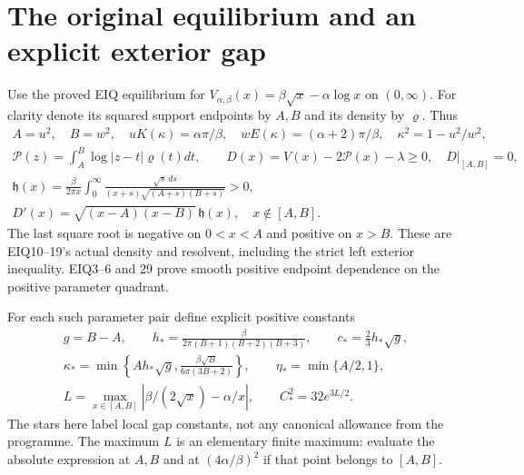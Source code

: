 \documentclass[11pt,a4paper]{article}
\begin{document}
\section{The original equilibrium and an explicit exterior gap}
Use the proved EIQ equilibrium for
$V_{\alpha,\beta}(x)=\beta\sqrt x-\alpha\log x$ on $(0,\infty)$.
For clarity denote its squared support endpoints by $A,B$ and its density by $\varrho$.
Thus
\begin{equation}
\begin{gathered}
 A=u^2,\quad B=w^2,\quad
 uK(\kappa)=\alpha\pi/\beta,\quad
 wE(\kappa)=(\alpha+2)\pi/\beta,\quad\kappa^2=1-u^2/w^2,\\
 \mathcal P(z)=\int_A^B\log|z-t|\varrho(t)dt,\qquad
 D(x)=V(x)-2\mathcal P(x)-\lambda\ge0,\quad D|_{[A,B]}=0,\\
 \mathfrak h(x)=\frac{\beta}{2\pi x}\int_0^\infty
   \frac{\sqrt{s}\,ds}{(x+s)\sqrt{(A+s)(B+s)}}>0,\\
 D'(x)=\sqrt{(x-A)(x-B)}\,\mathfrak h(x),\quad x\notin[A,B].
\end{gathered}\label{eor:eq:EIQ}
\end{equation}
The last square root is negative on $0<x<A$ and positive on $x>B$.
These are EIQ10--19's actual density and resolvent, including the strict left
exterior inequality. EIQ3--6 and 29 prove smooth positive endpoint dependence
on the positive parameter quadrant.

For each such parameter pair define explicit positive constants
\begin{equation}
\begin{gathered}
 g=B-A,\qquad
 h_* =\frac{\beta}{2\pi(B+1)(B+2)(B+3)},\qquad
 c_* =\frac23h_*\sqrt g,\\
 \kappa_* =\min\left\{A h_*\sqrt g,
               \frac{\beta\sqrt B}{6\pi(3B+2)}\right\},\qquad
 \eta_* =\min\{A/2,1\},\\
 L=\max_{x\in[A,B]}|\beta/(2\sqrt x)-\alpha/x|,
 \qquad C_*^2=32e^{3L/2}.
\end{gathered}\label{eor:eq:gapconstants}
\end{equation}
The stars here label local gap constants, not any canonical allowance from the
programme. The maximum $L$ is an elementary finite maximum: evaluate the absolute
expression at $A,B$ and at $(4\alpha/\beta)^2$ if that point belongs to $[A,B]$.
\end{document}
